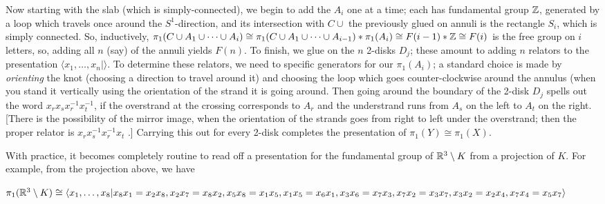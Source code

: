 Now starting with the slab (which is simply-connected), we begin to add the $A_i$ one at a time; each has fundamental group ${\Bbb Z}$,
generated by a loop which travels once around the $S^1$-direction, and its intersection with $C\cup$ the
previously glued on annuli is the rectangle $S_i$, which is simply connected. So, inductively,
$\pi_1(C\cup A_1\cup\cdots \cup A_i)\cong \pi_1(C\cup A_1\cup\cdots \cup A_{i-1})*\pi_1(A_i)\cong F(i-1)*{\Bbb Z}\cong F(i)$ is the 
free group on $i$ letters, so, adding all $n$ (say) of the annuli yields $F(n)$. To finish, we glue on the $n$ 2-disks $D_j$;
these amount to adding $n$ relators to the presentation $\langle x_1,\ldots,x_n | \rangle$. To determine these relators, we need
to  specific generators for our $\pi_1(A_i)$; a standard choice is made by {\it orienting} the knot
(choosing a direction to travel around it) and choosing the loop which goes counter-clockwise around the annulus (when you
stand it vertically using the orientation of the strand it is going around. Then going around the boundary of the 2-disk
$D_j$ spells out the word $x_rx_sx_r^{-1}x_t^{-1}$, if the overstrand at the crossing corresponds to $A_r$ and the
understrand runs from $A_s$ on the left to $A_t$ on the right. [There is the possibility of the mirror image, when the
orientation of the strands goes from right to left under the overstrand; then the proper relator is $x_rx_s^{-1}x_r^{-1}x_t$ .]
Carrying this out for every 2-disk completes the presentation of $\pi_1(Y)\cong \pi_1(X)$.



\ssk

With practice, it becomes completely routine to read off a presentation for the 
fundamental group of ${\Bbb R}^3\setminus K$ from a projection of $K$. For example, from the projection above, we have

\ssk

$\pi_1({\Bbb R}^3\setminus K)\cong \langle x_1,\ldots ,x_8 | x_8x_1=x_2x_8, x_2x_7=x_8x_2, x_5x_8=x_1x_5,
x_1x_5=x_6x_1, x_3x_6=x_7x_3 ,x_7x_2=x_3x_7 ,x_3x_2=x_2x_4, x_7x_4=x_5x_7\rangle$




\bsk

